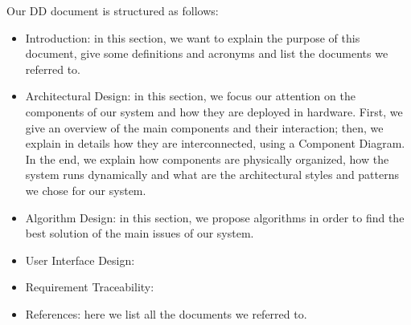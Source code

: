 Our DD document is structured as follows:
\begin{itemize}
    \item Introduction: in this section, we want to explain the purpose of this document, give some definitions and acronyms and list the documents we referred to. 
    \item Architectural Design: in this section, we focus our attention on the components of our system and how they are deployed in hardware. First, we give an overview of the main components and their interaction; then, we explain in details how they are interconnected, using a Component Diagram.
    In the end, we explain how components are physically organized, how the system runs dynamically and what are the architectural styles and patterns we chose for our system.
    \item Algorithm Design: in this section, we propose algorithms in order to find the best solution of the main issues of our system.
    \item User Interface Design:
    \item Requirement Traceability:
    \item References: here we list all the documents we referred to.
\end{itemize}